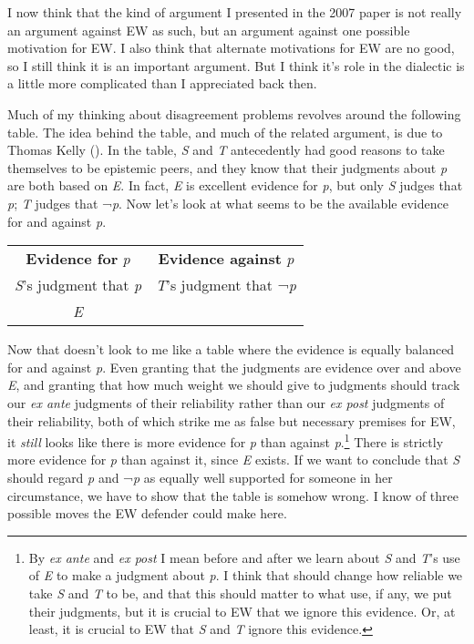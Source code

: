 \documentclass[
  10pt,
  letterpaper,
  DIV=11,
  numbers=noendperiod,
  twoside]{scrartcl}
\begin{document}
I now think that the kind of argument I presented in the 2007 paper is
not really an argument against EW as such, but an argument against one
possible motivation for EW. I also think that alternate motivations for
EW are no good, so I still think it is an important argument. But I
think it's role in the dialectic is a little more complicated than I
appreciated back then.

Much of my thinking about disagreement problems revolves around the
following table. The idea behind the table, and much of the related
argument, is due to Thomas Kelly
(). In the table, \emph{S} and
\emph{T} antecedently had good reasons to take themselves to be
epistemic peers, and they know that their judgments about \emph{p} are
both based on \emph{E}. In fact, \emph{E} is excellent evidence for
\emph{p}, but only \emph{S} judges that \emph{p}; \emph{T} judges that
¬\emph{p}. Now let's look at what seems to be the available evidence for
and against \emph{p}.

\begin{longtable}[]{@{}cc@{}}
\toprule\noalign{}
\endhead
\bottomrule\noalign{}
\endlastfoot
\textbf{Evidence for} \emph{p} & \textbf{Evidence against} \emph{p} \\
\emph{S}'s judgment that \emph{p} & \emph{T}'s judgment that
¬\emph{p} \\
\emph{E} & \\
\end{longtable}

Now that doesn't look to me like a table where the evidence is equally
balanced for and against \emph{p}. Even granting that the judgments are
evidence over and above \emph{E}, and granting that how much weight we
should give to judgments should track our \emph{ex ante} judgments of
their reliability rather than our \emph{ex post} judgments of their
reliability, both of which strike me as false but necessary premises for
EW, it \emph{still} looks like there is more evidence for \emph{p} than
against \emph{p}.\footnote{By \emph{ex ante} and \emph{ex post} I mean
  before and after we learn about \emph{S} and \emph{T}'s use of
  \emph{E} to make a judgment about \emph{p}. I think that should change
  how reliable we take \emph{S} and \emph{T} to be, and that this should
  matter to what use, if any, we put their judgments, but it is crucial
  to EW that we ignore this evidence. Or, at least, it is crucial to EW
  that \emph{S} and \emph{T} ignore this evidence.} There is strictly
more evidence for \emph{p} than against it, since \emph{E} exists. If we
want to conclude that \emph{S} should regard \emph{p} and ¬\emph{p} as
equally well supported for someone in her circumstance, we have to show
that the table is somehow wrong. I know of three possible moves the EW
defender could make here.
\end{document}
